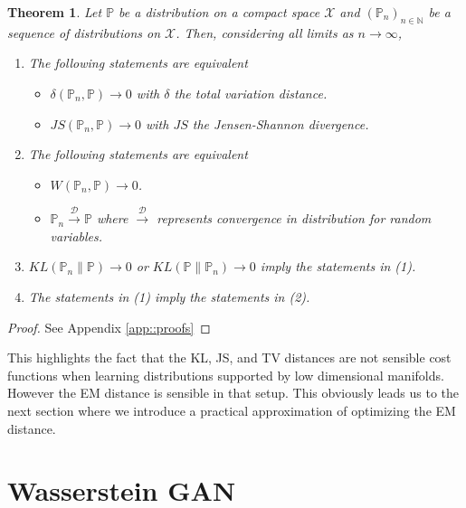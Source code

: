 \documentclass{article} %
\newcommand\NN{\mathbb{N}}
\newcommand\PP{\mathbb{P}}
\newtheorem{theo}{Theorem}
\theoremstyle{definition}
\theoremstyle{definition}
\newcommand\manX{\mathcal{X}}
\begin{document}
\begin{theo} \label{theo::dist}
Let $\PP$ be a distribution on a compact space $\manX$ and 
$(\PP_n)_{n \in \NN}$ be a sequence
of distributions on $\manX$. Then, considering
all limits as $n \to \infty$,
\begin{enumerate}
\item The following statements are equivalent
\begin{itemize}
  \item $\delta(\PP_n, \PP) \to 0$
with $\delta$ the total variation distance.
  \item $JS(\PP_n,\PP) \to 0$ with
$JS$ the Jensen-Shannon divergence.
\end{itemize}
\item The following statements are equivalent
\begin{itemize}
  \item $W(\PP_n, \PP) \to 0$.
  \item $\PP_n \xrightarrow{\mathcal{D}} \PP$ where $\xrightarrow{\mathcal{D}}$ represents
convergence in distribution for random variables.
\end{itemize}
\item $KL(\PP_n \| \PP) \to 0$ or $KL(\PP \| \PP_n) \to 0$ imply
the statements in (1). 
\item The statements in (1) imply the statements in (2).
\end{enumerate}
\end{theo}
\begin{proof}
See Appendix \ref{app::proofs}
\end{proof}

This highlights the fact that 
the KL, JS, and TV distances are not sensible
cost functions when learning distributions
supported by low dimensional manifolds.
However the EM distance is sensible
in that setup. This obviously leads us to the next section
where we introduce a practical approximation
of optimizing the EM distance.

\section{Wasserstein GAN}
\label{sec-wgan}
\end{document}
